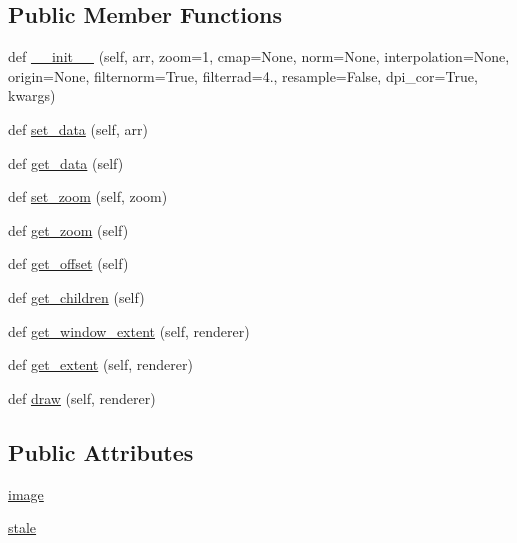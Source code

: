\subsection*{Public Member Functions}
\begin{DoxyCompactItemize}
\item 
def \hyperlink{classmatplotlib_1_1offsetbox_1_1OffsetImage_ac4777890724b1a1ee8a027d25abbcff2}{\+\_\+\+\_\+init\+\_\+\+\_\+} (self, arr, zoom=1, cmap=None, norm=None, interpolation=None, origin=None, filternorm=True, filterrad=4., resample=False, dpi\+\_\+cor=True, kwargs)
\item 
def \hyperlink{classmatplotlib_1_1offsetbox_1_1OffsetImage_aecb4a028a64440abb4cfa1d12140ba7c}{set\+\_\+data} (self, arr)
\item 
def \hyperlink{classmatplotlib_1_1offsetbox_1_1OffsetImage_ac9f3532f131b1f0973a82696fc35470b}{get\+\_\+data} (self)
\item 
def \hyperlink{classmatplotlib_1_1offsetbox_1_1OffsetImage_ac80b4cd433f3bb4af45ce93c3ff12263}{set\+\_\+zoom} (self, zoom)
\item 
def \hyperlink{classmatplotlib_1_1offsetbox_1_1OffsetImage_a23b98a7fcb57ba9da76ce35036948ffe}{get\+\_\+zoom} (self)
\item 
def \hyperlink{classmatplotlib_1_1offsetbox_1_1OffsetImage_a2f689d4253a13ab6267eea8eb91957d2}{get\+\_\+offset} (self)
\item 
def \hyperlink{classmatplotlib_1_1offsetbox_1_1OffsetImage_a25e753a0a2cca85687047a901205ef12}{get\+\_\+children} (self)
\item 
def \hyperlink{classmatplotlib_1_1offsetbox_1_1OffsetImage_a84668b15e9aeba26791e54e51414e501}{get\+\_\+window\+\_\+extent} (self, renderer)
\item 
def \hyperlink{classmatplotlib_1_1offsetbox_1_1OffsetImage_a2830fa060f6db25e0bf880b279a94677}{get\+\_\+extent} (self, renderer)
\item 
def \hyperlink{classmatplotlib_1_1offsetbox_1_1OffsetImage_a799726b313c58ac2c707ddf68bbe3dfc}{draw} (self, renderer)
\end{DoxyCompactItemize}
\subsection*{Public Attributes}
\begin{DoxyCompactItemize}
\item 
\hyperlink{classmatplotlib_1_1offsetbox_1_1OffsetImage_a6cc3ed336c6d194d56bab368f7a5ccf8}{image}
\item 
\hyperlink{classmatplotlib_1_1offsetbox_1_1OffsetImage_a831e9b409f04a901a24b176e8f1ae7be}{stale}
\end{DoxyCompactItemize}


